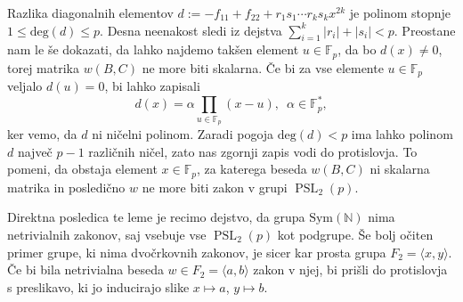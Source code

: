 \begin{dokaz}
Razlika diagonalnih elementov $d := -f_{11} + f_{22} + r_1 s_1 \cdots r_k s_k x^{2k}$ je polinom stopnje $1 \le \text{deg}(d) \le p$. Desna neenakost sledi iz dejstva
$\sum_{i = 1}^{k} \lvert r_i \rvert + \lvert s_i \rvert < p$. Preostane nam le še dokazati, da lahko najdemo takšen element $u \in \mathbb{F}_p$, da bo $d(x) \neq 0$, torej matrika $w(B, C)$ ne more biti skalarna.
Če bi za vse elemente $u \in \mathbb{F}_p$ veljalo $d(u) = 0$, bi lahko zapisali 
\begin{equation*}
    d(x) = \alpha \prod_{u \in  \mathbb{F}_p} (x - u), \,\,\, \alpha \in \mathbb{F}_p^{*},
\end{equation*}  
ker vemo, da $d$ ni ničelni polinom. Zaradi pogoja $\text{deg} (d) < p$ ima lahko polinom $d$ največ $p - 1$ različnih ničel, zato nas zgornji zapis vodi do protislovja.
To pomeni, da obstaja element $x \in \mathbb{F}_p$, za katerega beseda $w(B, C)$ ni skalarna matrika in posledično $w$ ne more biti zakon v grupi $\operatorname{PSL}_2(p)$. 


           
    \end{dokaz}

    Direktna posledica te leme je recimo dejstvo, da grupa $\text{Sym}(\mathbb{N})$ nima netrivialnih zakonov, saj vsebuje vse $\operatorname{PSL}_2(p)$ kot podgrupe.
    Še bolj očiten primer grupe, ki nima dvočrkovnih zakonov, je sicer kar prosta grupa $F_2 = \langle x , y \rangle$. Če bi bila netrivialna beseda $w \in F_2 = \langle a , b \rangle$ zakon v njej,
    bi prišli do protislovja s preslikavo, ki jo inducirajo slike $x \mapsto a$, $y \mapsto b$.
    
